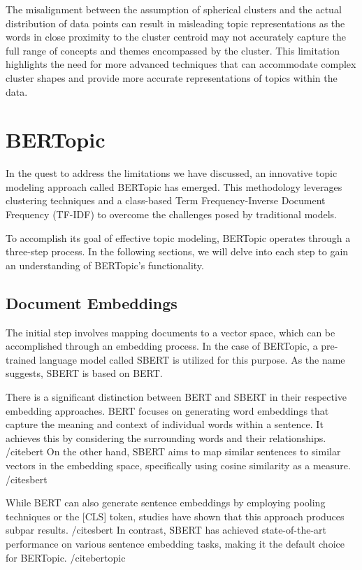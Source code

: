 \documentclass[a4paper,10pt]{report} %
\begin{document}
The misalignment between the assumption of spherical clusters and the actual distribution of data points can result in misleading topic representations as the words in close proximity to the cluster centroid may not accurately capture the full range of concepts and themes encompassed by the cluster. This limitation highlights the need for more advanced techniques that can accommodate complex cluster shapes and provide more accurate representations of topics within the data.

\section{BERTopic}
In the quest to address the limitations we have discussed, an innovative topic modeling approach called BERTopic has emerged. This methodology leverages clustering techniques and a class-based Term Frequency-Inverse Document Frequency (TF-IDF) to overcome the challenges posed by traditional models.

To accomplish its goal of effective topic modeling, BERTopic operates through a three-step process. In the following sections, we will delve into each step to gain an understanding of BERTopic's functionality.

\subsection{Document Embeddings}
The initial step involves mapping documents to a vector space, which can be accomplished through an embedding process. In the case of BERTopic, a pre-trained language model called SBERT is utilized for this purpose. As the name suggests, SBERT is based on BERT.

There is a significant distinction between BERT and SBERT in their respective embedding approaches. BERT focuses on generating word embeddings that capture the meaning and context of individual words within a sentence. It achieves this by considering the surrounding words and their relationships. /cite{bert} On the other hand, SBERT aims to map similar sentences to similar vectors in the embedding space, specifically using cosine similarity as a measure. /cite{sbert}

While BERT can also generate sentence embeddings by employing pooling techniques or the [CLS] token, studies have shown that this approach produces subpar results. /cite{sbert} In contrast, SBERT has achieved state-of-the-art performance on various sentence embedding tasks, making it the default choice for BERTopic. /cite{bertopic}
\end{document}

